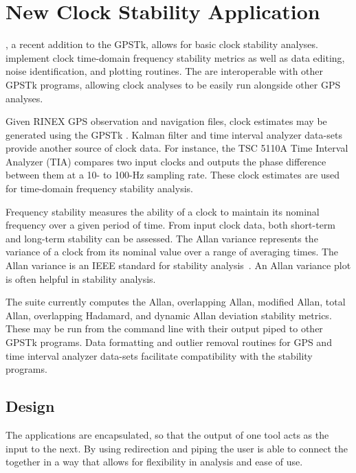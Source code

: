 \section*{New Clock Stability Application}

, a recent addition to the GPSTk, allows for
basic clock stability analyses.   implement
clock time-domain frequency stability metrics as well as data editing,
noise identification, and plotting routines.  The  are interoperable with other GPSTk programs, allowing clock
analyses to be easily run alongside other GPS analyses.

Given RINEX GPS observation and navigation files, clock estimates may
be generated using the GPSTk .
Kalman filter and time interval analyzer data-sets provide another
source of clock data.  For instance, the TSC 5110A Time Interval
Analyzer (TIA) compares two input clocks and outputs the phase
difference between them at a 10- to 100-Hz sampling rate.  These clock
estimates are used for time-domain frequency stability analysis.

Frequency stability measures the ability of a clock to maintain its nominal frequency over a given period of time.  From input clock data, both short-term and long-term stability can be assessed.  The Allan variance represents the variance of a clock from its nominal value over a range of averaging times.  The Allan variance is an IEEE standard for stability analysis~\cite{ieee1139}.  An Allan variance plot is often helpful in stability analysis.

The  suite currently computes the Allan, overlapping Allan, modified Allan, total Allan, overlapping Hadamard, and dynamic Allan deviation stability metrics.  These  may be run from the command line with their output piped to other GPSTk programs.  Data formatting and outlier removal routines for GPS and time interval analyzer data-sets facilitate compatibility with the  stability programs.

\subsection*{Design}

The  applications are encapsulated, so that the output of
one tool acts as the input to the next.  By using redirection and
piping the user is able to connect the  together in a way
that allows for flexibility in analysis and ease of use.

